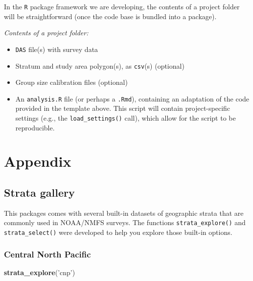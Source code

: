 \documentclass[
]{book}
\newenvironment{Shaded}{\begin{snugshade}}{\end{snugshade}}
\newcommand{\KeywordTok}[1]{\textcolor[rgb]{0.13,0.29,0.53}{\textbf{#1}}}
\newcommand{\NormalTok}[1]{#1}
\newcommand{\StringTok}[1]{\textcolor[rgb]{0.31,0.60,0.02}{#1}}
\providecommand{\tightlist}{%
  \setlength{\itemsep}{0pt}\setlength{\parskip}{0pt}}
\begin{document}
In the \texttt{R} package framework we are developing, the contents of a project folder will be straightforward (once the code base is bundled into a package).

\emph{Contents of a project folder:}

\begin{itemize}
\tightlist
\item
  \texttt{DAS} file(s) with survey data\\
\item
  Stratum and study area polygon(s), as \texttt{csv}(s) (optional)\\
\item
  Group size calibration files (optional)\\
\item
  An \texttt{analysis.R} file (or perhaps a \texttt{.Rmd}), containing an adaptation of the code provided in the template above. This script will contain project-specific settings (e.g., the \texttt{load\_settings()} call), which allow for the script to be reproducible.
\end{itemize}

\hypertarget{part-appendix}{%
\part{Appendix}\label{part-appendix}}

\hypertarget{stratagallery}{%
\chapter{Strata gallery}\label{stratagallery}}

This packages comes with several built-in datasets of geographic strata that are commonly used in NOAA/NMFS surveys. The functions \texttt{strata\_explore()} and \texttt{strata\_select()} were developed to help you explore those built-in options.

\hypertarget{central-north-pacific}{%
\section*{Central North Pacific}\label{central-north-pacific}}

\begin{Shaded}
\begin{Highlighting}[]
\KeywordTok{strata_explore}\NormalTok{(}\StringTok{'cnp'}\NormalTok{)}
\end{Highlighting}
\end{Shaded}
\end{document}
